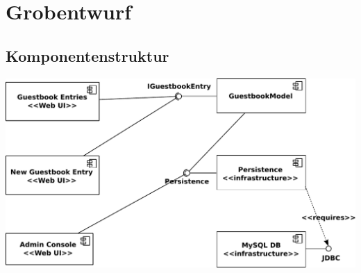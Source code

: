 \section{Grobentwurf}

\subsection{Komponentenstruktur}

\begin{figurehere}
\includegraphics[width=\columnwidth]{model-components}
\end{figurehere}



